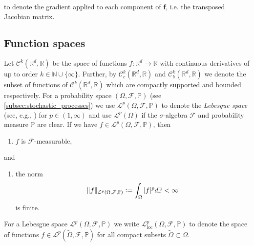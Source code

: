 \documentclass[12pt]{article}
\theoremstyle{definition}
\numberwithin{equation}{section}
\newcommand{\N}{\mathbb{N}}
\newcommand{\R}{\mathbb{R}}
\newcommand{\BP}{\mathbb{P}}
\newcommand{\CF}{\mathcal{F}}
\newcommand{\CL}{\mathcal{L}}
\newcommand{\CC}{\mathcal{C}}
\newcommand{\defeq}{\vcentcolon=}
\begin{document}
 to denote the gradient applied to each component of $\mathbf{f}$, i.e. the transposed Jacobian matrix.
\subsection{Function spaces}
Let $\CC^k(\R^d, \R)$ be the space of functions $f: \R^d \rightarrow \R$ with continuous derivatives of up to order $k \in \N \cup \{\infty\}$. Further, by $\CC_c^k(\R^d, \R)$ and $\CC_b^k(\R^d, \R)$ we denote the subset of functions of $\CC^k(\R^d, \R)$ which are compactly supported and bounded respectively.
For a probability space $(\Omega, \CF, \BP)$ (see \autoref{subsec:stochastic_processes}) we use $\CL^p(\Omega, \CF, \BP)$ to denote the \emph{Lebesgue space} (see, e.g., \cite[pp.~636]{evansPartialDifferentialEquations2010})  for $p \in (1,\infty)$ and use $\CL^p(\Omega)$ if the $\sigma$-algebra $\CF$ and probability measure $\BP$ are clear. If we have $f \in\CL^p(\Omega, \CF, \BP)$, then
\begin{enumerate}[label=(\roman*)]
  \item $f$ is $\CF$-measurable,
\end{enumerate}
and
\begin{enumerate}[resume, label=(\roman*)]
  \item the norm 
  \begin{equation*}
    \lVert f \rVert_{\CL^p(\Omega, \CF, \BP)} \defeq \int_{\Omega} |f|^p d\BP < \infty
  \end{equation*}
  is finite.
\end{enumerate}
For a Lebesgue space $\CL^p(\Omega, \CF, \BP)$ we write $\CL^p_{\text{loc}}(\Omega, \CF, \BP)$ to denote the space of functions $f \in \CL^p(\widetilde{\Omega}, \CF, \BP)$ for all compact subsets $\widetilde{\Omega} \subset \Omega$.
\end{document}
